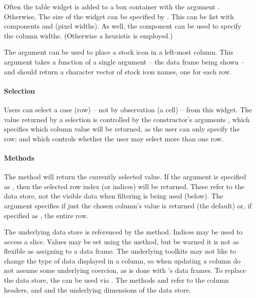 Often the table widget is added to a box container with the argument
. Otherwise, The size of the widget can be specified
by . This can be list with components 
and  (pixel widths). As well, the component
 can be used to specify the column
widths. (Otherwise a heuristic is employed.)

The  argument can be used to place a stock
icon in a left-most column.  This argument takes a function of a
single argument -- the data frame being shown -- and should return a
character vector of stock icon names, one for each row.

\paragraph{Selection}
Users can select a case (row) -- not by observation (a cell) -- from
this widget. The value returned by a selection is controlled by the
constructor's arguments , which specifies
which column value will be returned, as the user can only specify the
row; and  which controls whether the user
may select more than one row.

\paragraph{Methods}
The  method will return the currently selected
value. If the argument  is specified as , then
the selected row index (or indices) will be returned. These refer to
the data store, not the visible data when filtering is being used (below). The
argument  specifies if just the chosen column's value is
returned (the default) or, if specified as , the entire row.
 
The underlying data store is referenced by the \method{[}{gtable}
method. Indices may be used to access a slice. Values may be
set using the \method{[\ASSIGN}{gtable} method, but be warned it is
not as flexible as assigning to a data frame. The underlying
toolkits may not like to change the type of data displayed in a
column, so when updating a column do not assume some underlying
coercion, as is done with \R's data frames. To replace the data store, the \code{[\ASSIGN} can
be used via . The methods
 and  refer to the
column headers, and  and 
the underlying dimensions of the data store.

